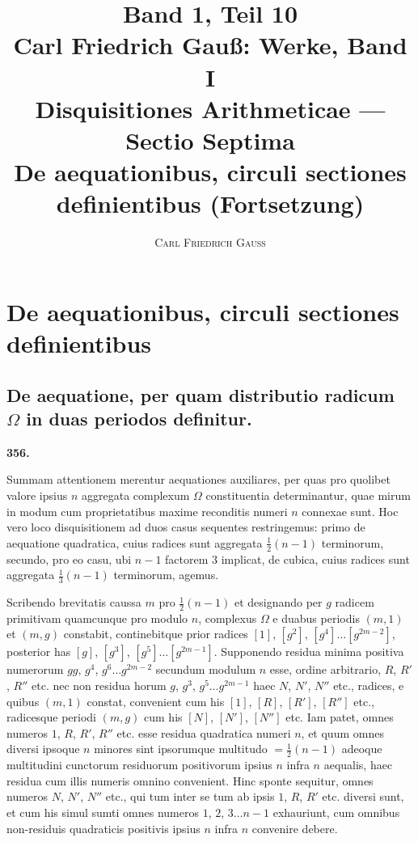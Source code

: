 \documentclass[12pt,a4paper]{article}
\title{\vspace{-1cm}\textbf{Band 1, Teil 10}\\[0.5em]
\large Carl Friedrich Gau\ss{}: Werke, Band I\\
\normalsize Disquisitiones Arithmeticae --- Sectio Septima\\
De aequationibus, circuli sectiones definientibus (Fortsetzung)
}
\author{\textsc{Carl Friedrich Gau\ss}}
\date{}
\theoremstyle{plain}
\theoremstyle{definition}
\theoremstyle{remark}
\begin{document}
\maketitle
\thispagestyle{empty}


\section*{De aequationibus, circuli sectiones definientibus}

\subsection*{De aequatione, per quam distributio radicum $\Omega$ in duas periodos definitur.}

\begin{center}
\textbf{356.}
\end{center}

Summam attentionem merentur aequationes auxiliares, per quas pro quolibet valore ipsius $n$ aggregata complexum $\Omega$ constituentia determinantur, quae mirum in modum cum proprietatibus maxime reconditis numeri $n$ connexae sunt. Hoc vero loco disquisitionem ad duos casus sequentes restringemus: primo de aequatione quadratica, cuius radices sunt aggregata $\tfrac{1}{2}(n-1)$ terminorum, secundo, pro eo casu, ubi $n-1$ factorem $3$ implicat, de cubica, cuius radices sunt aggregata $\tfrac{1}{3}(n-1)$ terminorum, agemus.

Scribendo brevitatis caussa $m$ pro $\tfrac{1}{2}(n-1)$ et designando per $g$ radicem primitivam quamcunque pro modulo $n$, complexus $\Omega$ e duabus periodis $(m,1)$ et $(m,g)$ constabit, continebitque prior radices $[1]$, $[g^2]$, $[g^4] \ldots [g^{2m-2}]$, posterior has $[g]$, $[g^3]$, $[g^5] \ldots [g^{2m-1}]$. Supponendo residua minima positiva numerorum $gg$, $g^4$, $g^6 \ldots g^{2m-2}$ secundum modulum $n$ esse, ordine arbitrario, $R$, $R'$, $R''$ etc. nec non residua horum $g$, $g^3$, $g^5 \ldots g^{2m-1}$ haec $N$, $N'$, $N''$ etc., radices, e quibus $(m,1)$ constat, convenient cum his $[1]$, $[R]$, $[R']$, $[R'']$ etc., radicesque periodi $(m,g)$ cum his $[N]$, $[N']$, $[N'']$ etc. Iam patet, omnes numeros $1$, $R$, $R'$, $R''$ etc. esse residua quadratica numeri $n$, et quum omnes diversi ipsoque $n$ minores sint ipsorumque multitudo $= \tfrac{1}{2}(n-1)$ adeoque multitudini cunctorum residuorum positivorum ipsius $n$ infra $n$ aequalis, haec residua cum illis numeris omnino convenient. Hinc sponte sequitur, omnes numeros $N$, $N'$, $N''$ etc., qui tum inter se tum ab ipsis $1$, $R$, $R'$ etc. diversi sunt, et cum his simul sumti omnes numeros $1$, $2$, $3 \ldots n-1$ exhauriunt, cum omnibus non-residuis quadraticis positivis ipsius $n$ infra $n$ convenire debere.
\end{document}
